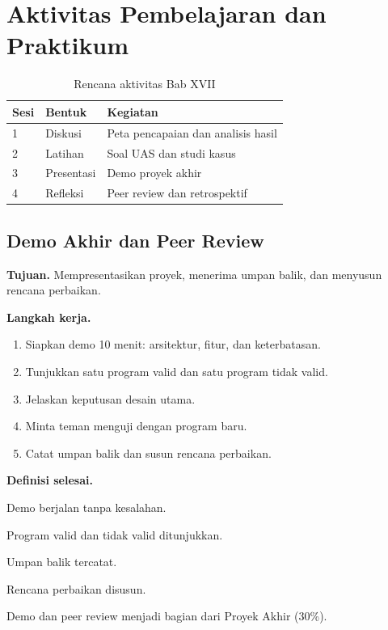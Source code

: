 \section*{Aktivitas Pembelajaran dan Praktikum}

\begin{table}[H]
\centering
\caption{Rencana aktivitas Bab XVII}
\label{tab:ch17-aktivitas}
\begin{tabularx}{\textwidth}{@{}llX@{}}
\toprule
\textbf{Sesi} & \textbf{Bentuk} & \textbf{Kegiatan} \\
\midrule
1 & Diskusi & Peta pencapaian dan analisis hasil \\
2 & Latihan & Soal UAS dan studi kasus \\
3 & Presentasi & Demo proyek akhir \\
4 & Refleksi & Peer review dan retrospektif \\
\bottomrule
\end{tabularx}
\end{table}

\subsection*{Demo Akhir dan Peer Review}
\textbf{Tujuan.} Mempresentasikan proyek, menerima umpan balik, dan
menyusun rencana perbaikan.

\textbf{Langkah kerja.}
\begin{enumerate}[label=\arabic*.,leftmargin=*]
  \item Siapkan demo 10 menit: arsitektur, fitur, dan keterbatasan.
  \item Tunjukkan satu program valid dan satu program tidak valid.
  \item Jelaskan keputusan desain utama.
  \item Minta teman menguji dengan program baru.
  \item Catat umpan balik dan susun rencana perbaikan.
\end{enumerate}

\textbf{Definisi selesai.}
\begin{checklist}
  \item Demo berjalan tanpa kesalahan.
  \item Program valid dan tidak valid ditunjukkan.
  \item Umpan balik tercatat.
  \item Rencana perbaikan disusun.
\end{checklist}

Demo dan peer review menjadi bagian dari Proyek Akhir (30\%).
